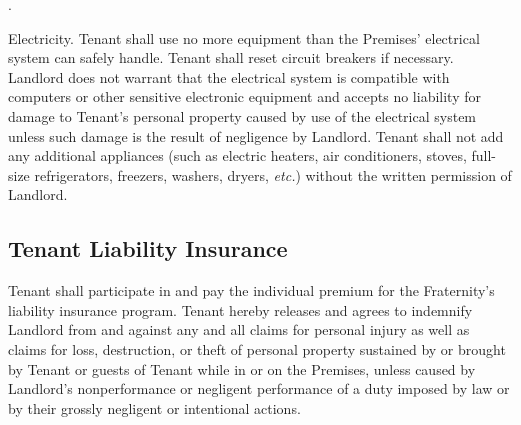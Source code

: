 \documentclass{article}
\begin{document}
\begin{compactList}{.}{}
  \item {\titleStyle Electricity.} Tenant shall use no more equipment than the
  Premises’ electrical system can safely handle. Tenant shall reset circuit
  breakers if necessary. Landlord does not warrant that the electrical system is
  compatible with computers or other sensitive electronic equipment and accepts
  no liability for damage to Tenant’s personal property caused by use of the
  electrical system unless such damage is the result of negligence by Landlord.
  Tenant shall not add any additional appliances (such as electric heaters, air
  conditioners, stoves, full-size refrigerators, freezers, washers, dryers,
  \textit{etc.}) without the written permission of Landlord.
\end{compactList}

\subsection{Tenant Liability Insurance}
Tenant shall participate in and pay the individual premium for the Fraternity’s
liability insurance program. Tenant hereby releases and agrees to indemnify
Landlord from and against any and all claims for personal injury as well as
claims for loss, destruction, or theft of personal property sustained by or
brought by Tenant or guests of Tenant while in or on the Premises, unless caused
by Landlord’s nonperformance or negligent performance of a duty imposed by law
or by their grossly negligent or intentional actions.

\hspace*{\dimexpr-\oddsidemargin-1in-\hoffset\relax}%
\restoregeometry
\end{document}
